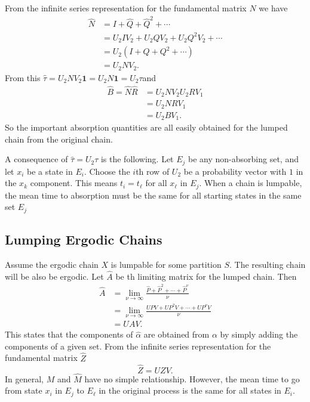 \documentclass[12pt]{article}
\begin{document}
From the infinite series representation for the fundamental matrix $N$
we have
\begin{align*}
  \hat{N} &= I + \hat{Q} + \hat{Q}^2 + \cdots \\
          &= U_2 I V_2+ U_2 Q V_2 + U_2 Q^2 V_2 + \cdots \\
          &= U_2 (I +  Q  +  Q^2 + \cdots) \\
          &= U_2 N V_2.
\end{align*}
From this \( \hat{\tau} = U_2 N V_2 \mathbf{1} = U_2 N  \mathbf{1} =
U_2 \tau\)and
\begin{align*}
  \hat{B} = \hat{N} \hat{R} &= U_2 N V_2 U_2 R V_1 \\
                            &= U_2 N R V_1 \\
                            &= U_2 B V_1.
\end{align*}
So the important absorption quantities are all easily obtained for the
lumped chain from the original chain.

A consequence of $\hat{\tau} = U_2 \tau$ is the following.
Let $E_j$ be any non-absorbing set, and let $x_i$ be a state in
$E_i$.  Choose the $i$th row of $U_2$ be a probability vector with $1$
in the $x_k$ component.  This means $t_i = t_\ell$ for all $x_\ell$ in
$E_j$.  When a chain is lumpable, the mean time to absorption must be
the same for all starting states in the same set $E_j$

\subsection*{Lumping Ergodic Chains}

Assume the ergodic chain $X$ is lumpable for some partition $S$.  The
resulting chain will be also be ergodic.  Let $\hat{A}$ be th limiting
matrix for the lumped chain.  Then
\begin{align*}
  \hat{A} &= \lim_{\nu \to \infty} \frac{\hat{P} + \hat{P}^2 + \cdots +
            \hat{P}^{\nu}}{\nu} \\
  &= \lim_{\nu \to \infty} \frac{UPV + UP^2V + \cdots +
    UP^{\nu}V}{\nu} \\
  & = UAV.
\end{align*}
This states that the components of $\hat{\alpha}$ are obtained from
$\alpha$ by simply adding the components of a given set.  From the
infinite series representation for the fundamental matrix $\hat{Z}$
\[
  \hat{Z} = U Z V.
\]
In general, $M$ and $\hat{M}$ have no simple relationship.
However, the mean time to go from state $x_i$ in $E_j$ to $E_{\ell}$
in the original process is the same for all states in $E_i$.  
\end{document}
